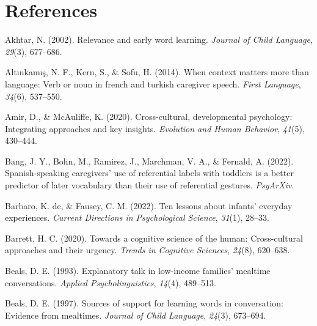 \documentclass[
  man,floatsintext]{apa6}
\newlength{\cslhangindent}
\newlength{\cslentryspacingunit} %
\newenvironment{CSLReferences}[2] %
 {%
  \setlength{\parindent}{0pt}
  \ifodd #1
  \let\oldpar\par
  \def\par{\hangindent=\cslhangindent\oldpar}
  \fi
  \setlength{\parskip}{#2\cslentryspacingunit}
 }%
 {}
\begin{document}
\newpage

\hypertarget{references}{%
\section{References}\label{references}}

\hypertarget{refs}{}
\begin{CSLReferences}{1}{0}
\leavevmode{}%
Akhtar, N. (2002). Relevance and early word learning. \emph{Journal of Child Language}, \emph{29}(3), 677--686.

\leavevmode{}%
Altınkamış, N. F., Kern, S., \& Sofu, H. (2014). When context matters more than language: Verb or noun in french and turkish caregiver speech. \emph{First Language}, \emph{34}(6), 537--550.

\leavevmode{}%
Amir, D., \& McAuliffe, K. (2020). Cross-cultural, developmental psychology: Integrating approaches and key insights. \emph{Evolution and Human Behavior}, \emph{41}(5), 430--444.

\leavevmode{}%
Bang, J. Y., Bohn, M., Ramirez, J., Marchman, V. A., \& Fernald, A. (2022). Spanish-speaking caregivers' use of referential labels with toddlers is a better predictor of later vocabulary than their use of referential gestures. \emph{PsyArXiv}.

\leavevmode{}%
Barbaro, K. de, \& Fausey, C. M. (2022). Ten lessons about infants' everyday experiences. \emph{Current Directions in Psychological Science}, \emph{31}(1), 28--33.

\leavevmode{}%
Barrett, H. C. (2020). Towards a cognitive science of the human: Cross-cultural approaches and their urgency. \emph{Trends in Cognitive Sciences}, \emph{24}(8), 620--638.

\leavevmode{}%
Beals, D. E. (1993). Explanatory talk in low-income families' mealtime conversations. \emph{Applied Psycholinguistics}, \emph{14}(4), 489--513.

\leavevmode{}%
Beals, D. E. (1997). Sources of support for learning words in conversation: Evidence from mealtimes. \emph{Journal of Child Language}, \emph{24}(3), 673--694.


\end{CSLReferences}
\end{document}
